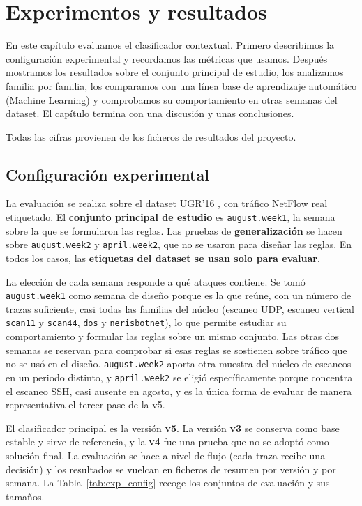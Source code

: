 \chapter{Experimentos y resultados}
\label{cap:experimentos}

En este capítulo evaluamos el clasificador contextual. Primero describimos la configuración experimental y recordamos las métricas que usamos. Después mostramos los resultados sobre el conjunto principal de estudio, los analizamos familia por familia, los comparamos con una línea base de aprendizaje automático (Machine Learning) y comprobamos su comportamiento en otras semanas del dataset. El capítulo termina con una discusión y unas conclusiones.

Todas las cifras provienen de los ficheros de resultados del proyecto.

\section{Configuración experimental}
\label{sec:exp_configuracion}

La evaluación se realiza sobre el dataset UGR'16 \cite{ugr16}, con tráfico NetFlow real etiquetado. El \textbf{conjunto principal de estudio} es \texttt{august.week1}, la semana sobre la que se formularon las reglas. Las pruebas de \textbf{generalización} se hacen sobre \texttt{august.week2} y \texttt{april.week2}, que no se usaron para diseñar las reglas. En todos los casos, las \textbf{etiquetas del dataset se usan solo para evaluar}.

La elección de cada semana responde a qué ataques contiene. Se tomó \texttt{august.week1} como semana de diseño porque es la que reúne, con un número de trazas suficiente, casi todas las familias del núcleo (escaneo UDP, escaneo vertical \texttt{scan11} y \texttt{scan44}, \texttt{dos} y \texttt{nerisbotnet}), lo que permite estudiar su comportamiento y formular las reglas sobre un mismo conjunto. Las otras dos semanas se reservan para comprobar si esas reglas se sostienen sobre tráfico que no se usó en el diseño. \texttt{august.week2} aporta otra muestra del núcleo de escaneos en un periodo distinto, y \texttt{april.week2} se eligió específicamente porque concentra el escaneo SSH, casi ausente en agosto, y es la única forma de evaluar de manera representativa el tercer pase de la v5.

El clasificador principal es la versión \textbf{v5}. La versión \textbf{v3} se conserva como base estable y sirve de referencia, y la \textbf{v4} fue una prueba que no se adoptó como solución final. La evaluación se hace a nivel de flujo (cada traza recibe una decisión) y los resultados se vuelcan en ficheros de resumen por versión y por semana. La Tabla~\ref{tab:exp_config} recoge los conjuntos de evaluación y sus tamaños.

